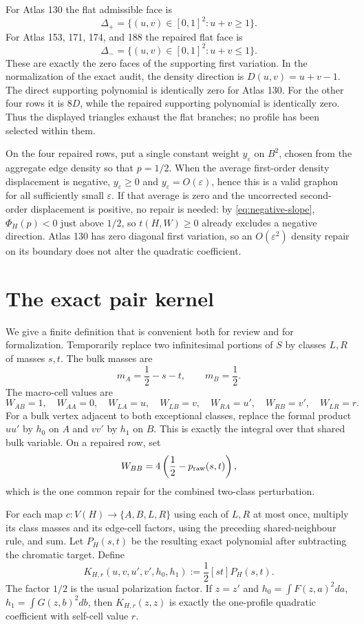 \documentclass[11pt]{article}
\begin{document}
For Atlas 130 the flat admissible face is
\[
 \Delta_+=\{(u,v)\in[0,1]^2:u+v\geq1\}.
\]
For Atlas 153, 171, 174, and 188 the repaired flat face is
\[
 \Delta_-=\{(u,v)\in[0,1]^2:u+v\leq1\}.
\]
These are exactly the zero faces of the supporting first variation.  In the
normalization of the exact audit, the density direction is
$D(u,v)=u+v-1$.  The direct supporting polynomial is identically zero for
Atlas 130.  For the other four rows it is $8D$, while the repaired supporting
polynomial is identically zero.  Thus the displayed triangles exhaust the
flat branches; no profile has been selected within them.

On the four repaired rows, put a single constant weight $y_\varepsilon$ on
$B^2$, chosen from the aggregate edge density so that $p=1/2$.  When the
average first-order density displacement is negative,
$y_\varepsilon\geq0$ and $y_\varepsilon=O(\varepsilon)$, hence this is a
valid graphon for all sufficiently small $\varepsilon$.  If that average is
zero and the uncorrected second-order displacement is positive, no repair is
needed: by \eqref{eq:negative-slope}, $\Phi_H(p)<0$ just above $1/2$, so
$t(H,W)\geq0$ already excludes a negative direction.  Atlas 130 has zero
diagonal first variation, so an $O(\varepsilon^2)$ density repair on its
boundary does not alter the quadratic coefficient.

\section{The exact pair kernel}

We give a finite definition that is convenient both for review and for
formalization.  Temporarily replace two infinitesimal portions of $S$ by
classes $L,R$ of masses $s,t$.  The bulk masses are
\[
 m_A=\frac12-s-t,\qquad m_B=\frac12.
\]
The macro-cell values are
\[
 W_{AB}=1,\quad W_{AA}=0,\quad
 W_{LA}=u,\quad W_{LB}=v,\quad
 W_{RA}=u',\quad W_{RB}=v',\quad W_{LR}=r.
\]
For a bulk vertex adjacent to both exceptional classes, replace the formal
product $uu'$ by $h_0$ on $A$ and $vv'$ by $h_1$ on $B$.  This is exactly
the integral over that shared bulk variable.  On a repaired row, set
\[
 W_{BB}=4\left(\frac12-p_{\rm raw}(s,t)\right),
\]
which is the one common repair for the combined two-class perturbation.

For each map $c:V(H)\to\{A,B,L,R\}$ using each of $L,R$ at most once,
multiply its class masses and its edge-cell factors, using the preceding
shared-neighbour rule, and sum.  Let $P_H(s,t)$ be the resulting exact
polynomial after subtracting the chromatic target.  Define
\begin{equation}
 K_{H,r}(u,v,u',v',h_0,h_1)
 :=\frac12[st]P_H(s,t).
 \label{eq:pair-kernel}
\end{equation}
The factor $1/2$ is the usual polarization factor.  If $z=z'$ and
$h_0=\int F(z,a)^2da$, $h_1=\int G(z,b)^2db$, then
$K_{H,r}(z,z)$ is exactly the one-profile quadratic coefficient with
self-cell value $r$.
\end{document}
